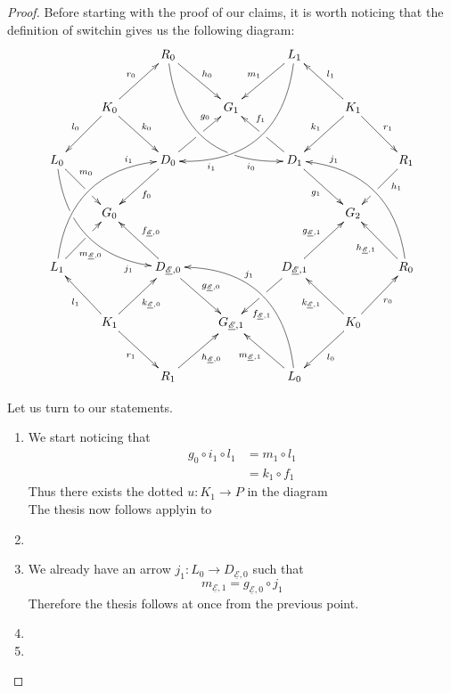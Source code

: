 \documentclass[a4paper]{article}
\newcommand{\dder}[1]{\mathscr{#1}}
\newcommand{\der}[1]{\underline{\dder{#1}}}
\theoremstyle{definition}
\begin{document}
\begin{proof}
	Before starting with the proof of our claims, it is worth noticing that the definition of switchin gives us the following diagram:
			\[\xymatrix@R=28pt{&&R_0 \ar@/_1.15cm/[ddrr]_(.8){i_0}|(.68)\hole \ar[dr]^{h_0}&& L_1\ar@/^1.15cm/[ddll]^(.8){i_1}  \ar[dl]_{m_1}\\&K_0\ar[dr]^{k_0}\ar[dl]_{l_0} \ar[ur]^{r_0}&& G_1 && K_1 \ar[dl]_{k_1}\ar[lu]_{l_1} \ar[dr]^{r_1}\\L_0 \ar@/_.94cm/[ddrr]_(.8){j_1}|(.31)\hole \ar[dr]^(.35){m_0}|(.6)\hole && D_0 \ar[dl]^{f_0}\ar[ur]|(.5)\hole^(.7){g_0}&&D_1 \ar[dr]_{g_1} \ar[ul]|(.5)\hole_(.65){f_1}&&R_1\ar[dl]^(.35){h_1}|(.6)\hole\\&G_0 &&&&G_2\\L_1 \ar@/^.94cm/[uurr]^(.8){i_1} \ar[ur]_(.35){m_{\der{E},0}}|(.61)\hole&&D_{\der{E},0} \ar[ul]_{f_{\der{E},0}}\ar[dr]^{g_{\der{E},0}} &&D_{\der{E},1}\ar[ur]^{g_{\der{E},1}} \ar[dl]|(.5)\hole^(.7){f_{\der{E},1}} && R_0  \ar@/_.94cm/[uull]_(.8){j_1} \ar[ul]^{h_{\der{E},1}}\\&K_1 \ar[ur]_{k_{\der{E},0}} \ar[dr]_{r_1} \ar[ul]^{l_1}&&G_{\der{E},1}&& K_0 \ar[ur]_{r_0} \ar[ul]^{k_{\der{E},1}} \ar[dl]^{l_0} \\&& R_1 \ar[ur]_{h_{\der{E},0}}&& L_0 \ar[ul]^{m_{\der{E},1}} \ar@/_1.15cm/[uull]_(.6){j_1} }\]
			
			Let us turn to our statements.
	\begin{enumerate}
		\item We start noticing that 
		\begin{align*}
			g_0\circ i_1\circ l_1&=m_1\circ l_1\\&=k_1\circ f_1
		\end{align*}
		Thus there exists the dotted $u\colon K_1\to P$ in the diagram
		\[\]
		The thesis now follows applyin  to
		
		

		\item 
		\item  We already have an arrow $j_1\colon L_0\to D_{\der{E},0}$ such that
		\[m_{\der{E},1}=g_{\der{E},0}\circ j_1\]
		Therefore the thesis follows at once from the previous point.

	
	
	\item 
		
		\item \qedhere 
	\end{enumerate}
\end{proof}
\end{document}
